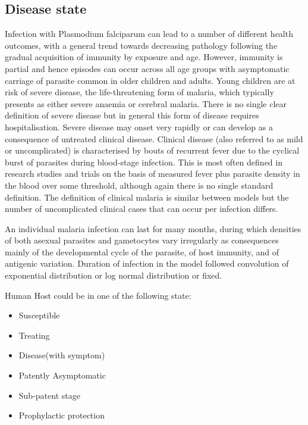 \documentclass[a4paper, 12pt, twoside]{article}
\begin{document}
\subsection{Disease state}
Infection with Plasmodium falciparum can lead to a number of different health outcomes, with a general trend towards decreasing pathology following the gradual acquisition of immunity by exposure and age.
However, immunity is partial and hence episodes can occur across all age groups with asymptomatic carriage of parasite common in older children and adults.
Young children are at risk of severe disease, the life-threatening form of malaria, which typically presents as either severe anaemia or cerebral malaria.
There is no single clear definition of severe disease but in general this form of disease requires hospitalisation.
Severe disease may onset very rapidly or can develop as a consequence of untreated clinical disease.
Clinical disease (also referred to as mild or uncomplicated) is characterised by bouts of recurrent fever due to the cyclical burst of parasites during blood-stage infection.
This is most often defined in research studies and trials on the basis of measured fever plus parasite density in the blood over some threshold, although again there is no single standard definition.
The definition of clinical malaria is similar between models but the number of uncomplicated clinical cases that can occur per infection differs.

An individual malaria infection can last for many months, during which densities of both asexual parasites and gametocytes vary irregularly as consequences mainly of the developmental cycle of the parasite, of host immunity, and of antigenic variation.
Duration of infection in the model followed convolution of exponential distribution or log normal distribution or fixed.

Human Host could be in one of the following state:
\begin{itemize}
	\item Susceptible
	\item Treating
	\item Disease(with symptom)
	\item Patently Asymptomatic
	\item Sub-patent stage
	\item Prophylactic protection
\end{itemize}
\end{document}
